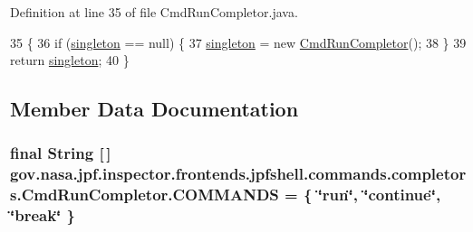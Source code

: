 Definition at line 35 of file Cmd\+Run\+Completor.\+java.


\begin{DoxyCode}
35                                               \{
36     \textcolor{keywordflow}{if} (\hyperlink{classgov_1_1nasa_1_1jpf_1_1inspector_1_1frontends_1_1jpfshell_1_1commands_1_1completors_1_1_cmd_run_completor_ab9dfa61331cad662287fb66da080067f}{singleton} == null) \{
37       \hyperlink{classgov_1_1nasa_1_1jpf_1_1inspector_1_1frontends_1_1jpfshell_1_1commands_1_1completors_1_1_cmd_run_completor_ab9dfa61331cad662287fb66da080067f}{singleton} = \textcolor{keyword}{new} \hyperlink{classgov_1_1nasa_1_1jpf_1_1inspector_1_1frontends_1_1jpfshell_1_1commands_1_1completors_1_1_cmd_run_completor_a09ccf244b9103972d583d324cea02214}{CmdRunCompletor}();
38     \}
39     \textcolor{keywordflow}{return} \hyperlink{classgov_1_1nasa_1_1jpf_1_1inspector_1_1frontends_1_1jpfshell_1_1commands_1_1completors_1_1_cmd_run_completor_ab9dfa61331cad662287fb66da080067f}{singleton};
40   \}
\end{DoxyCode}


\subsection{Member Data Documentation}
\subsubsection[{\texorpdfstring{C\+O\+M\+M\+A\+N\+DS}{COMMANDS}}]{\setlength{\rightskip}{0pt plus 5cm}final String \mbox{[}$\,$\mbox{]} gov.\+nasa.\+jpf.\+inspector.\+frontends.\+jpfshell.\+commands.\+completors.\+Cmd\+Run\+Completor.\+C\+O\+M\+M\+A\+N\+DS = \{ \char`\"{}run\char`\"{}, \char`\"{}continue\char`\"{}, \char`\"{}break\char`\"{} \}\hspace{0.3cm}{\ttfamily [static]}}\hypertarget{classgov_1_1nasa_1_1jpf_1_1inspector_1_1frontends_1_1jpfshell_1_1commands_1_1completors_1_1_cmd_run_completor_ad33ac35ef60807841cb7de63cd946e9d}{}\label{classgov_1_1nasa_1_1jpf_1_1inspector_1_1frontends_1_1jpfshell_1_1commands_1_1completors_1_1_cmd_run_completor_ad33ac35ef60807841cb7de63cd946e9d}


